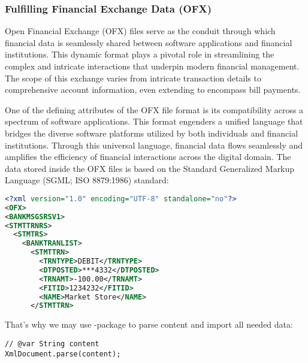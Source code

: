 \subsubsection{Fulfilling Financial Exchange Data (OFX)}

Open Financial Exchange (OFX) files serve as the conduit through which financial data is seamlessly shared between 
software applications and financial institutions. This dynamic format plays a pivotal role in streamlining the complex 
and intricate interactions that underpin modern financial management. The scope of this exchange varies from intricate 
transaction details to comprehensive account information, even extending to encompass bill payments.

One of the defining attributes of the OFX file format is its compatibility across a spectrum of software applications. 
This format engenders a unified language that bridges the diverse software platforms utilized by both individuals and 
financial institutions. Through this universal language, financial data flows seamlessly and amplifies the efficiency 
of financial interactions across the digital domain. The data stored inside the OFX files is based on the Standard 
Generalized Markup Language (SGML; ISO 8879:1986) standard:

\begin{lstlisting}[language=xml]
<?xml version="1.0" encoding="UTF-8" standalone="no"?>
<OFX>
<BANKMSGSRSV1>
<STMTTRNRS>
  <STMTRS>
    <BANKTRANLIST>
      <STMTTRN>
        <TRNTYPE>DEBIT</TRNTYPE>
        <DTPOSTED>***4332</DTPOSTED>
        <TRNAMT>-100.00</TRNAMT>
        <FITID>1234232</FITID>
        <NAME>Market Store</NAME>
      </STMTTRN>
\end{lstlisting}

\noindent That's why we may use -package to parse content and import all needed data:

\begin{lstlisting}
// @var String content
XmlDocument.parse(content);
\end{lstlisting}
